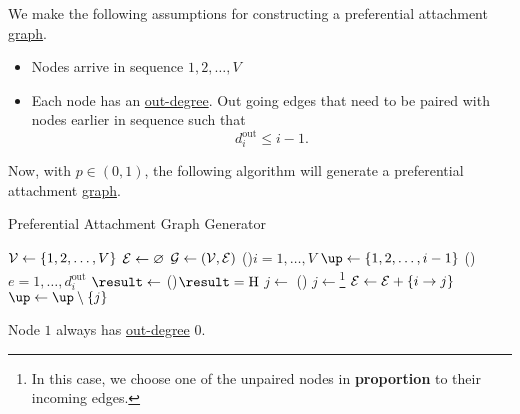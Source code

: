 We make the following assumptions for constructing a preferential attachment \hyperref[def:graph]{graph}.
\begin{itemize}
	\item Nodes arrive in sequence \(1, 2, \ldots , V\)
	\item Each node has an \hyperref[def:out-degree]{out-degree}. Out going edges that need to be paired with nodes earlier in sequence such that
	      \[
		      d_{i}^{\text{out}} \leq i - 1.
	      \]
\end{itemize}

Now, with \(p\in(0, 1)\), the following algorithm will generate a preferential attachment \hyperref[def:graph]{graph}.
\par
\begin{algorithm}[H]\label{algo:preferential-attachment-graph-generator-algo}
	\DontPrintSemicolon
	\caption{Preferential Attachment Graph Generator}
	\BlankLine

	\(\mathcal{\MakeUppercase{v}} \gets \{1, 2, \ldots , V\}\)\;
	\(\mathcal{\MakeUppercase{e}} \gets \varnothing\)\;
	\(\mathcal{\MakeUppercase{g}} \gets (\mathcal{\MakeUppercase{v}} , \mathcal{\MakeUppercase{e}} )\) 
	\;
	\For(){\(i = 1, \ldots  , V\)}{
	\(\up\gets \{1, 2, \ldots , i-1 \}\)
	\For(){\(e = 1, \ldots, d^{\text{out}}_i\)}{
	\(\result\gets\) 
	\uIf(){\(\result = \mathrm{H}\)}{
		\(j\gets\)\rand{\(\up\) }
	}\Else(){
	\(j\gets \)\footnote{In this case, we choose one of the unpaired nodes in \textbf{proportion} to their incoming edges.}\;
	}
	\;
	\(\mathcal{\MakeUppercase{e}} \gets \mathcal{\MakeUppercase{e}} + \{i \to j\}\)
	\(\up\gets \up \setminus \{j\}\)
	}
	}

	\;
\end{algorithm}

\begin{remark}
	Node \(1 \) always has \hyperref[def:out-degree]{out-degree} \(0\).
\end{remark}

